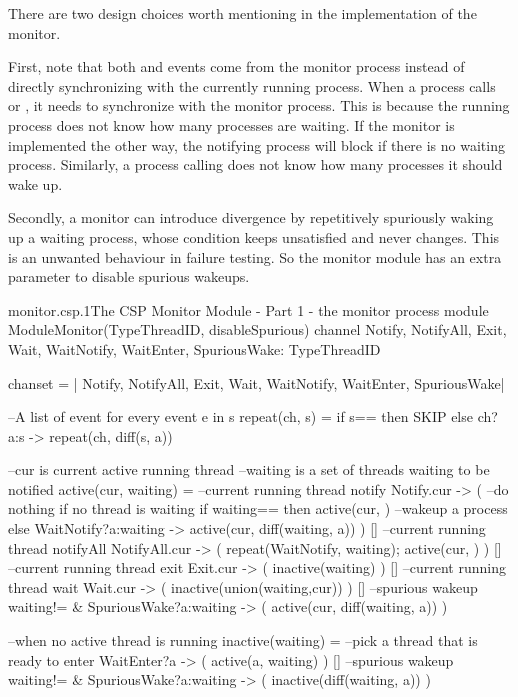 \documentclass{article}
\begin{document}
There are two design choices worth mentioning in the implementation of the monitor. 

First, note that both  and  events come from the monitor process instead of directly synchronizing with the currently running process. When a process calls  or , it needs to synchronize with the monitor process. This is because the running process does not know how many processes are waiting. If the monitor is implemented the other way, the notifying process will block if there is no waiting process. Similarly, a process calling  does not know how many processes it should wake up. 

Secondly, a monitor can introduce divergence by repetitively spuriously waking up a waiting process, whose condition keeps unsatisfied and never changes. This is an unwanted behaviour in failure testing. So the monitor module has an extra parameter  to disable spurious wakeups. 


\begin{cspfloat}{monitor.csp.1}{The CSP Monitor Module - Part 1 - the monitor process}
module ModuleMonitor(TypeThreadID, disableSpurious)
  channel Notify, NotifyAll, Exit, Wait, 
          WaitNotify, WaitEnter, SpuriousWake: TypeThreadID

  chanset = {| Notify, NotifyAll, Exit, Wait, WaitNotify, WaitEnter, SpuriousWake|}

  --A list of event for every event e in s
  repeat(ch, s) = if s=={} then SKIP else ch?a:s -> repeat(ch, diff(s, {a}))

  --cur is current active running thread
  --waiting is a set of threads waiting to be notified
  active(cur, waiting) =
    --current running thread notify
    Notify.cur -> (
      --do nothing if no thread is waiting
      if waiting=={} then active(cur, {})
      --wakeup a process
      else WaitNotify?a:waiting -> 
           active(cur, diff(waiting, {a}))
    ) [] --current running thread notifyAll
    NotifyAll.cur -> (
      repeat(WaitNotify, waiting);
      active(cur, {})
    ) [] --current running thread exit
    Exit.cur -> (
      inactive(waiting)
    ) [] --current running thread wait
    Wait.cur -> (
      inactive(union(waiting,{cur}))
    ) [] --spurious wakeup
    waiting!={} & SpuriousWake?a:waiting -> (
      active(cur, diff(waiting, {a}))
    )

  --when no active thread is running
  inactive(waiting) = 
    --pick a thread that is ready to enter
    WaitEnter?a -> (
      active(a, waiting)
    ) []
    --spurious wakeup
    waiting!={} & SpuriousWake?a:waiting -> (
      inactive(diff(waiting, {a}))
    )
\end{cspfloat}
\end{document}
